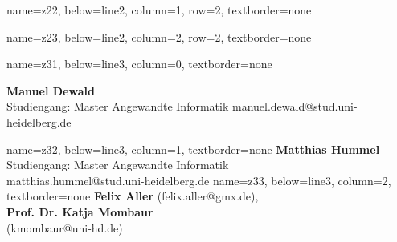 \documentclass[portrait,a0paper]{baposter}
\begin{document}
\begin{poster}
{ }
    {
    name=z22,
    below=line2,
    column=1,
    row=2,
    textborder=none
    }
    {
      \lipsum[2-3]

 }
 \headerbox{}
    {
    name=z23,
    below=line2,
    column=2,
    row=2,
    textborder=none
    }
    {
        \lipsum[4-5]

 }



 {}

    {
    name=z31,
    below=line3,
    column=0,
    textborder=none
    }
    {
    \textsf{\textbf{Manuel Dewald}\\
    Studiengang: Master Angewandte Informatik
	manuel.dewald@stud.uni-heidelberg.de
	}

 }
  \headerbox{}
    {
    name=z32,
    below=line3,
    column=1,
    textborder=none
    }
    {
    \textsf{\textbf{Matthias Hummel}\\
    	Studiengang: Master Angewandte Informatik\\
	matthias.hummel@stud.uni-heidelberg.de 
	}
 }
    {
    name=z33,
    below=line3,
    column=2,
    textborder=none
    }
    {
    \textsf{\textbf{Felix Aller} (felix.aller@gmx.de),\\
    \textbf{Prof. Dr. Katja Mombaur}\\(kmombaur@uni-hd.de)}
  }


\end{poster}
\end{document}

